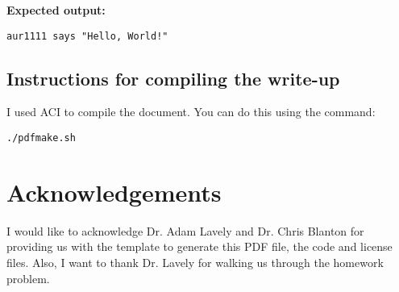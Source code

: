 \documentclass{article}
\begin{document}
\begin{spacing}{1.1}
\textbf{Expected output:}
\begin{verbatim}
aur1111 says "Hello, World!"
\end{verbatim}

\subsection{Instructions for compiling the write-up}

I used ACI to compile the document.  You can do this using the command:
\begin{verbatim}
./pdfmake.sh
\end{verbatim}


\section{Acknowledgements}

I would like to acknowledge Dr. Adam Lavely and Dr. Chris Blanton for providing us with the template to generate this PDF file, the code and license files. Also, I want to thank Dr. Lavely for walking us through the homework problem.




\end{spacing}
\end{document}
